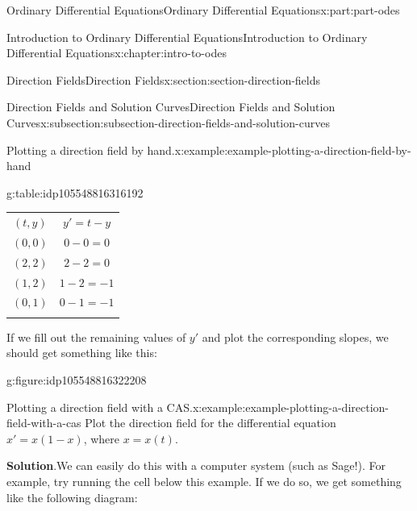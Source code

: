 \documentclass[twoside,10pt,]{book}
\newcommand{\blocktitlefont}{\relax}
\numberwithin{equation}{part}
\newcommand{\hrulethin}  {\noalign{\hrule height 0.04em}}
\newcommand{\hrulethick} {\noalign{\hrule height 0.11em}}
\begin{document}
\begin{partptx}{Ordinary Differential Equations}{}{Ordinary Differential Equations}{}{}{x:part:part-odes}
\begin{chapterptx}{Introduction to Ordinary Differential Equations}{}{Introduction to Ordinary Differential Equations}{}{}{x:chapter:intro-to-odes}
\begin{sectionptx}{Direction Fields}{}{Direction Fields}{}{}{x:section:section-direction-fields}
\begin{subsectionptx}{Direction Fields and Solution Curves}{}{Direction Fields and Solution Curves}{}{}{x:subsection:subsection-direction-fields-and-solution-curves}
\begin{example}{Plotting a direction field by hand.}{x:example:example-plotting-a-direction-field-by-hand}
\begin{tableptx}{\textbf{}}{g:table:idp105548816316192}{}
{\begin{tabular}{cc}
\((t,y)\)&\(y' = t-y\)\tabularnewline\hrulethin
\((0,0)\)&\(0-0 = 0\)\tabularnewline\hrulethin
\((2,2)\)&\(2-2=0\)\tabularnewline\hrulethin
\((1,2)\)&\(1-2 = -1\)\tabularnewline\hrulethin
\((0,1)\)&\(0-1=-1\)\tabularnewline\hrulethick
\end{tabular}
}%
\end{tableptx}%
 If we fill out the remaining values of \(y'\) and plot the corresponding slopes, we should get something like this:%
\begin{figureptx}{}{g:figure:idp105548816322208}{}%
\begin{image}{0.25}{0.5}{0.25}%
%
\end{image}%
\tcblower
\end{figureptx}%
\end{example}
\begin{example}{Plotting a direction field with a CAS.}{x:example:example-plotting-a-direction-field-with-a-cas}%
Plot the direction field for the differential equation \(x' = x(1-x)\), where \(x=x(t)\).%
\par\smallskip%
\noindent\textbf{\blocktitlefont Solution}.\hypertarget{g:solution:idp105548816357280}{}\quad{}We can easily do this with a computer system (such as Sage!). For example, try running the cell below this example. If we do so, we get something like the following diagram:%

\end{example}
\end{subsectionptx}
\end{sectionptx}
\end{chapterptx}
\end{partptx}
\end{document}
